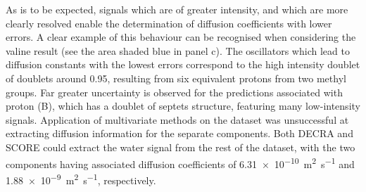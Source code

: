 As is to be expected, signals which are of greater intensity, and which are
more clearly resolved enable the determination of diffusion coefficients with
lower errors. A clear example of this behaviour can be recognised when
considering the valine result (see the area shaded blue in panel c). The
oscillators which lead to diffusion constants with the lowest errors correspond to
the high intensity doublet of doublets around \qty{0.95}{\partspermillion},
resulting from six equivalent protons from two methyl groups. Far
greater uncertainty is observed for the predictions associated with proton (B),
which has a doublet of septets structure, featuring many low-intensity signals.
Application of multivariate methods on the dataset was unsuccessful at
extracting diffusion information for the separate components. Both
\ac{DECRA} and \ac{SCORE} could extract the water
signal from the rest of the dataset, with the two components having associated
diffusion coefficients of \qty{6.31e-10}{\meter\squared\per\second}
and \qty{1.88e-9}{\meter\squared\per\second}, respectively.

